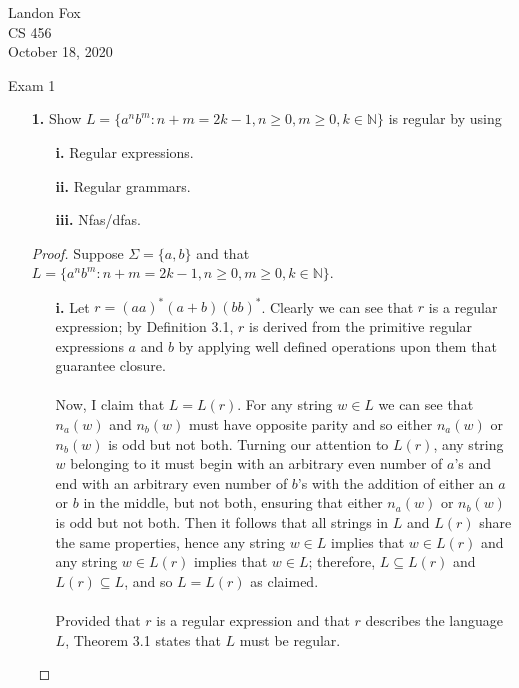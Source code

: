\documentclass[ 12pt ]{article}
\begin{document}
\noindent Landon Fox \\
\noindent CS 456 \\
\noindent October 18, 2020

\begin{center}
	\Large Exam 1
\end{center}

\begin{enumerate}
	\item[\textbf{1.}] Show $L = \{ a^n b^m : n + m = 2k - 1, n \geq 0, m \geq 0, k \in \mathbb{N} \}$ is regular by using
		\begin{enumerate}
			\item[\textbf{i.}] Regular expressions.
			\item[\textbf{ii.}] Regular grammars.
			\item[\textbf{iii.}] Nfas/dfas.
		\end{enumerate}

		\begin{proof}
			Suppose $\Sigma = \{ a, b \}$ and that $L = \{ a^n b^m : n + m = 2k - 1, n \geq 0, m \geq 0, k \in \mathbb{N} \}$.
			\begin{enumerate}
				\item[\textbf{i.}] Let $r = (aa)^*(a + b)(bb)^*$. Clearly we can see that $r$ is a regular expression; by Definition 3.1, $r$ is derived from the primitive regular
					expressions $a$ and $b$ by applying well defined operations upon them that guarantee closure. \\ \\
					Now, I claim that $L = L(r)$. For any string $w \in L$ we can see that $n_a(w)$ and $n_b(w)$ must have opposite parity and so either $n_a(w)$ or $n_b(w)$ is odd but
					not both. Turning our attention to $L(r)$, any string $w$ belonging to it must begin with an arbitrary even number of $a$'s and end with an arbitrary even number of
					$b$'s with the addition of either an $a$ or $b$ in the middle, but not both, ensuring that either $n_a(w)$ or $n_b(w)$ is odd but not both. Then it follows that all
					strings in $L$ and $L(r)$ share the same properties, hence any string $w \in L$ implies that $w \in L(r)$ and any string $w \in L(r)$ implies that $w \in L$; therefore,
					$L \subseteq L(r)$ and $L(r) \subseteq L$, and so $L = L(r)$ as claimed. \\ \\
					Provided that $r$ is a regular expression and that $r$ describes the language $L$, Theorem 3.1 states that $L$ must be regular.


\end{enumerate}
\end{proof}
\end{enumerate}
\end{document}
